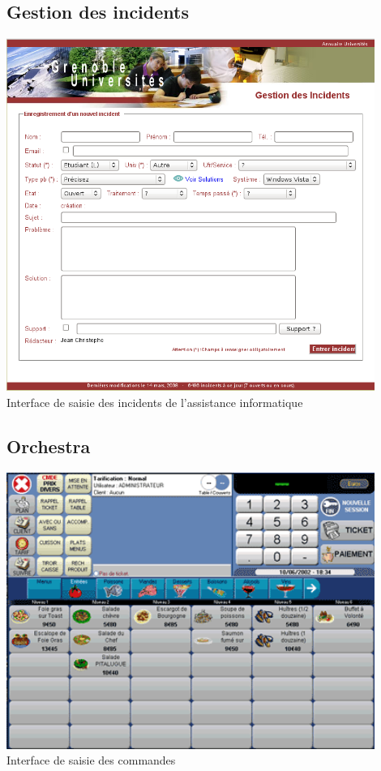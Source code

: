 \subsection{Gestion des incidents}
\label{gestion_incidents}
\begin{center}
	\includegraphics[width=12cm]{annexes/images/gestion_des_incidents.png} \\
	Interface de saisie des incidents de l'assistance informatique
\end{center}

\subsection{Orchestra}
\label{bar_orchestra}
\begin{center}
	\includegraphics[width=12cm]{annexes/images/bar_orchestra.png} \\
	Interface de saisie des commandes
\end{center}

